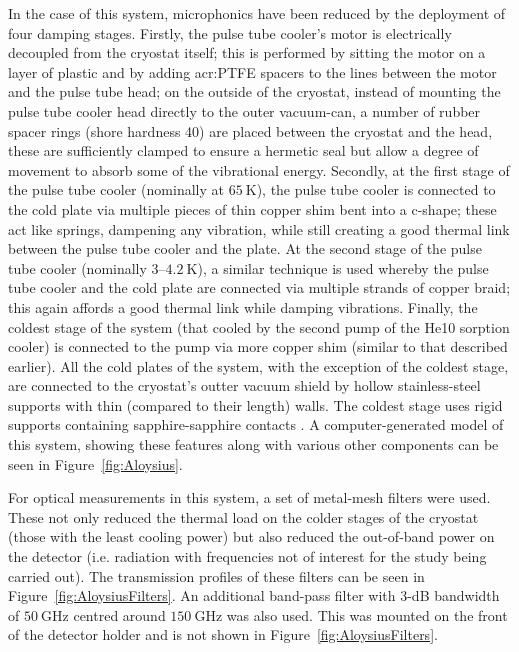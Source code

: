 In the case of this system, microphonics have been reduced by the deployment of four damping stages. Firstly, the pulse tube cooler's motor is electrically decoupled from the cryostat itself; this is performed by sitting the motor on a layer of plastic and by adding \gls{acr:PTFE} spacers to the lines between the motor and the pulse tube head; on the outside of the cryostat, instead of mounting the pulse tube cooler head directly to the outer vacuum-can, a number of rubber spacer rings (shore hardness 40) are placed between the cryostat and the head, these are sufficiently clamped to ensure a hermetic seal but allow a degree of movement to absorb some of the vibrational energy. Secondly, at the first stage of the pulse tube cooler (nominally at $65~\mathrm{K}$), the pulse tube cooler is connected to the cold plate via multiple pieces of thin copper shim bent into a c-shape; these act like springs, dampening any vibration, while still creating a good thermal link between the pulse tube cooler and the plate. At the second stage of the pulse tube cooler (nominally $3\mbox{--}4.2~\mathrm{K}$), a similar technique is used whereby the pulse tube cooler and the cold plate are connected via multiple strands of copper braid; this again affords a good thermal link while damping vibrations. Finally, the coldest stage of the system (that cooled by the second  pump of the He10 sorption cooler) is connected to the pump via more copper shim (similar to that described earlier). All the cold plates of the system, with the exception of the coldest stage, are connected to the cryostat's outter vacuum shield by hollow stainless-steel supports with thin (compared to their length) walls. The coldest stage uses rigid supports containing sapphire-sapphire contacts \parencite[these have been described by][]{Bintley2007}. A computer-generated model of this system, showing these features along with various other components can be seen in Figure~\ref{fig:Aloysius}.
\par 
For optical measurements in this system, a set of metal-mesh filters \parencite[as described by][]{Ade2006} were used. These not only reduced the thermal load on the colder stages of the cryostat (those with the least cooling power) but also reduced the out-of-band power on the detector (i.e. radiation with frequencies not of interest for the study being carried out). The transmission profiles of these filters can be seen in Figure~\ref{fig:AloysiusFilters}. An additional band-pass filter with 3-dB bandwidth of $50~\mathrm{GHz}$ centred around $150~\mathrm{GHz}$ was also used. This was mounted on the front of the detector holder and is not shown in Figure~\ref{fig:AloysiusFilters}.
%
